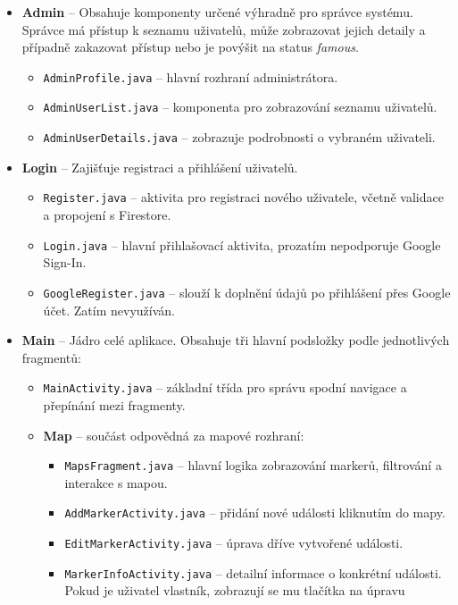 \begin{itemize}
  \item \textbf{Admin} – Obsahuje komponenty určené výhradně pro správce systému. Správce má přístup k seznamu uživatelů, může zobrazovat jejich detaily a případně zakazovat přístup nebo je povýšit na status \textit{famous}.
  \begin{itemize}
    \item \texttt{AdminProfile.java} – hlavní rozhraní administrátora.
    \item \texttt{AdminUserList.java} – komponenta pro zobrazování seznamu uživatelů.
    \item \texttt{AdminUserDetails.java} – zobrazuje podrobnosti o vybraném uživateli.
  \end{itemize}

  \item \textbf{Login} – Zajišťuje registraci a přihlášení uživatelů.
  \begin{itemize}
    \item \texttt{Register.java} – aktivita pro registraci nového uživatele, včetně validace a propojení s Firestore.
    \item \texttt{Login.java} – hlavní přihlašovací aktivita, prozatím nepodporuje Google Sign-In.
    \item \texttt{GoogleRegister.java} – slouží k doplnění údajů po přihlášení přes Google účet. Zatím nevyužíván.
  \end{itemize}

  \item \textbf{Main} – Jádro celé aplikace. Obsahuje tři hlavní podsložky podle jednotlivých fragmentů:
  \begin{itemize}
    \item \texttt{MainActivity.java} – základní třída pro správu spodní       navigace a přepínání mezi fragmenty.
    \item \textbf{Map} – součást odpovědná za mapové rozhraní:
    \begin{itemize}
      \item \texttt{MapsFragment.java} – hlavní logika zobrazování markerů, filtrování a interakce s mapou.
      \item \texttt{AddMarkerActivity.java} – přidání nové události kliknutím do mapy.
      \item \texttt{EditMarkerActivity.java} – úprava dříve vytvořené události.
      \item \texttt{MarkerInfoActivity.java} – detailní informace o konkrétní události. Pokud je uživatel vlastník, zobrazují se mu tlačítka na úpravu
    \end{itemize}


\end{itemize}
\end{itemize}
